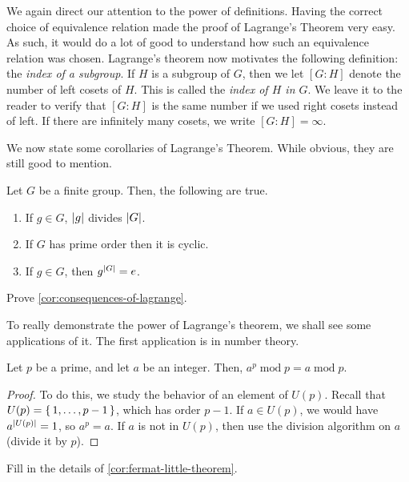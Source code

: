 \documentclass[./main.tex]{subfiles}
\begin{document}
We again direct our attention to the power of definitions. Having the correct
choice of equivalence relation made the proof of Lagrange's Theorem very easy.
As such, it would do a lot of good to understand how such an equivalence
relation was chosen. Lagrange's theorem now motivates the following definition:
the \emph{index of a subgroup}. If $H$ is a subgroup of $G$, then we let $[G:H]$
denote the number of left cosets of $H$. This is called the \emph{index of $H$
in $G$}. We leave it to the reader to verify that $[G:H]$ is the same number if
we used right cosets instead of left. If there are infinitely many cosets, we
write $[G:H] = \infty$.

We now state some corollaries of Lagrange's Theorem. While
obvious, they are still good to mention.
\begin{corollary}
\label{cor:consequences-of-lagrange}
    Let $G$ be a finite group. Then, the following are true.
    \begin{enumerate}
        \item If $g \in G$, $\abs{g}$ divides $\abs{G}$.
        \item If $G$ has prime order then it is cyclic.
        \item If $g \in G$, then $g^{\abs G} = e$.
    \end{enumerate}
\end{corollary}
\begin{exercise}
    Prove \cref{cor:consequences-of-lagrange}.
\end{exercise}

To really demonstrate the power of Lagrange's theorem, we shall see some
applications of it. The first application is in number theory. 

\begin{corollary}
\label{cor:fermat-little-theorem}
    Let $p$ be a prime, and let $a$ be an integer. Then, $a^p \operatorname{mod}
    p = a \operatorname{mod} p$.  
\end{corollary}
\begin{proof}
    To do this, we study the behavior of an element of $U(p)$. Recall that $U(p)
    = \set{1, \dots, p-1}$, which has order $p-1$. If $a \in U(p)$, we would
    have $a^{\abs{U(p)}} = 1$, so $a^p = a$. If $a$ is not in $U(p)$, then use
    the division algorithm on $a$ (divide it by $p$).
\end{proof}
\begin{exercise}
    Fill in the details of \cref{cor:fermat-little-theorem}.
\end{exercise}
\end{document}
